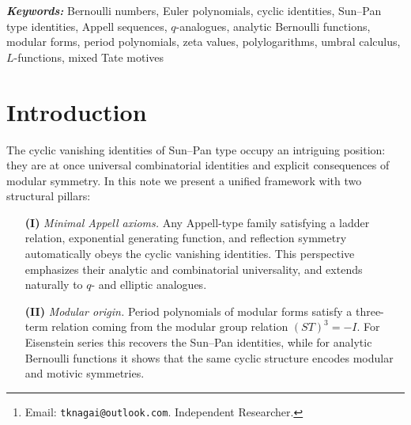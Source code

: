 \documentclass[12pt]{article}
\title{\PaperTitle}
\author{Ken Nagai\thanks{Email: \texttt{tknagai@outlook.com}. Independent Researcher.}}
\date{}
\numberwithin{equation}{section}
\providecommand{\keywords}[1]
{
  \small	
  \textbf{\textit{Keywords:}} #1
}
\newcommand{\PaperKeywords}{%
Bernoulli numbers, Euler polynomials, cyclic identities, Sun--Pan type identities,
Appell sequences, $q$-analogues, analytic Bernoulli functions, modular forms,
period polynomials, zeta values, polylogarithms, umbral calculus,
$L$-functions, mixed Tate motives}
\begin{document}
\maketitle

\begin{abstract}
We revisit the cyclic identities of Sun--Pan type for Bernoulli polynomials
and their $q$-analogues. From the analytic side, we formulate minimal Appell
axioms that force cyclic vanishing identities, extending naturally to
$q$-Appell sequences and analytic Bernoulli functions. From the modular side,
we show that the same relations arise as period polynomial identities
associated with Eisenstein series, reflecting the symmetry $(ST)^3=-I$ of the
modular group. These two complementary perspectives place the Sun--Pan cyclic
identities at the crossroads of number theory, special functions, and modular
forms, and suggest further connections to polylogarithms, $L$-values, and
mixed Tate motives.
\end{abstract}

\keywords{\PaperKeywords}

\section{Introduction}

The cyclic vanishing identities of Sun--Pan type occupy an intriguing position:
they are at once universal combinatorial identities and explicit consequences
of modular symmetry. In this note we present a unified framework with two
structural pillars:

\begin{itemize}
\item[\textbf{(I)}] \emph{Minimal Appell axioms.}  
Any Appell-type family satisfying a ladder relation, exponential generating
function, and reflection symmetry automatically obeys the cyclic vanishing
identities. This perspective emphasizes their analytic and combinatorial
universality, and extends naturally to $q$- and elliptic analogues.

\item[\textbf{(II)}] \emph{Modular origin.}  
Period polynomials of modular forms satisfy a three-term relation coming from
the modular group relation $(ST)^3=-I$. For Eisenstein series this recovers
the Sun--Pan identities, while for analytic Bernoulli functions it shows that
the same cyclic structure encodes modular and motivic symmetries.
\end{itemize}
\end{document}
